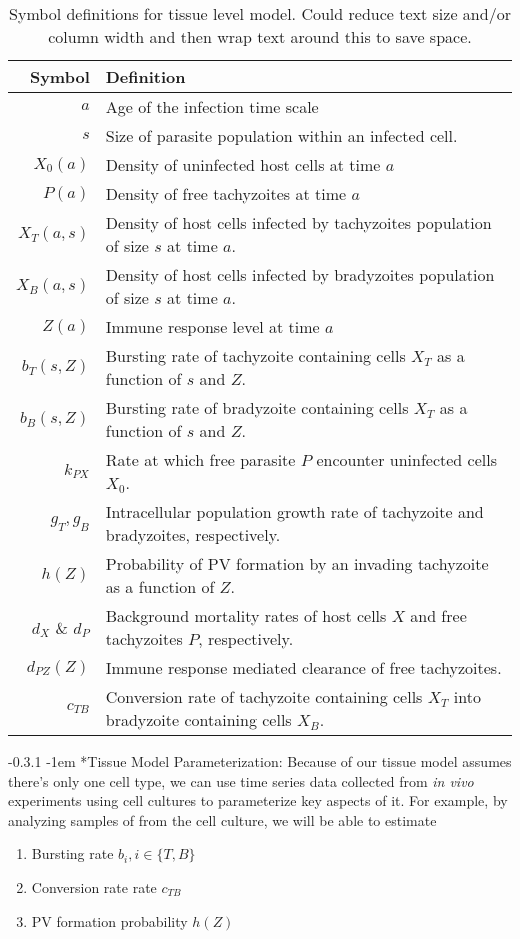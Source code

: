 \documentclass[11pt,fleqn,letterpaper]{article}
\makeatletter
\newcommand{\invitro}{\emph{in vivo}\xspace}
\renewcommand{\paragraph}{\@startsection{paragraph}{4}{\z@}%
    {-0.3\baselineskip \@plus0.25\baselineskip \@minus.1\baselineskip}%
    {-1em}%
    {\normalfont\normalsize\bfseries}}
\makeatother
\begin{document}
\begin{table}
\begin{tabularx}{\linewidth}{ r X } %
Symbol & Definition\\ \hline
$a$ & Age of the infection time scale\\
$s$ & Size of parasite population within an infected cell.\\
$X_0(a)$ & Density of uninfected host cells at time  $a$\\
$P(a)$ & Density of free tachyzoites at time $a$\\
$X_T(a,s)$ & Density of host cells infected by tachyzoites population of size $s$ at time $a$. \\
$X_B(a,s)$ & Density of host cells infected by bradyzoites population of size $s$ at time $a$. \\
$Z(a)$ & Immune response level at time $a$\\
$b_T(s, Z)$& Bursting rate of tachyzoite containing cells $X_T$ as a function of $s$ and $Z$.\\
$b_B(s, Z)$& Bursting rate of bradyzoite containing cells $X_T$ as a function of $s$ and $Z$.\\
$k_{PX}$ & Rate at which free parasite $P$ encounter uninfected cells $X_0$.\\
$g_T, g_B$ & Intracellular population growth rate of tachyzoite and bradyzoites, respectively.\\
$h(Z)$ & Probability of PV formation by an invading tachyzoite as a function of $Z$.\\
$d_X$ \& $d_P$ & Background mortality rates of host cells $X$ and free tachyzoites $P$, respectively.\\
$d_{PZ}(Z)$ & Immune response mediated clearance of free tachyzoites.\\
$c_{TB}$ & Conversion rate of tachyzoite containing cells $X_T$ into bradyzoite containing cells $X_B$.
\end{tabularx}
\caption{Symbol definitions for tissue level model.
  Could reduce text size and/or column width and then wrap text around this to save space.
}
\end{table}

\paragraph*{Tissue Model Parameterization:}
Because of our  tissue model assumes there's only one cell type, we can use time series data collected from \invitro experiments using cell cultures to parameterize key aspects of it.
For example, by analyzing samples of from the cell culture, we will be able to estimate
\begin{enumerate}
\item Bursting rate $b_i, i \in \{T, B\}$
\item Conversion rate rate $c_{TB}$
\item PV formation probability $h(Z)$
\end{enumerate}
\end{document}
